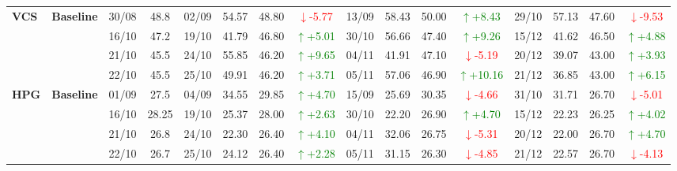 \documentclass{ieeeaccess}
\begin{document}
{\begin{longtable}{llcc|cccc|cccc|cccc}
\multirow{4}{*}{\textbf{VCS}}
& \textbf{Baseline}
& 30/08 & 48.8 & 02/09 & 54.57 & 48.80 & \textcolor{red}{\(\downarrow\)-5.77} & 13/09 & 58.43 & 50.00 & \textcolor{green}{\(\uparrow\)+8.43} & 29/10 & 57.13 & 47.60 & \textcolor{red}{\(\downarrow\)-9.53} \\
& & 16/10 & 47.2 & 19/10 & 41.79 & 46.80 & \textcolor{green}{\(\uparrow\)+5.01} & 30/10 & 56.66 & 47.40 & \textcolor{green}{\(\uparrow\)+9.26} & 15/12 & 41.62 & 46.50 & \textcolor{green}{\(\uparrow\)+4.88} \\
& & 21/10 & 45.5 & 24/10 & 55.85 & 46.20 & \textcolor{green}{\(\uparrow\)+9.65} & 04/11 & 41.91 & 47.10 & \textcolor{red}{\(\downarrow\)-5.19} & 20/12 & 39.07 & 43.00 & \textcolor{green}{\(\uparrow\)+3.93} \\
& & 22/10 & 45.5 & 25/10 & 49.91 & 46.20 & \textcolor{green}{\(\uparrow\)+3.71} & 05/11 & 57.06 & 46.90 & \textcolor{green}{\(\uparrow\)+10.16} & 21/12 & 36.85 & 43.00 & \textcolor{green}{\(\uparrow\)+6.15} \\
\midrule

\multirow{4}{*}{\textbf{HPG}}
& \textbf{Baseline}
& 01/09 & 27.5 & 04/09 & 34.55 & 29.85 & \textcolor{green}{\(\uparrow\)+4.70} & 15/09 & 25.69 & 30.35 & \textcolor{red}{\(\downarrow\)-4.66} & 31/10 & 31.71 & 26.70 & \textcolor{red}{\(\downarrow\)-5.01} \\
& & 16/10 & 28.25 & 19/10 & 25.37 & 28.00 & \textcolor{green}{\(\uparrow\)+2.63} & 30/10 & 22.20 & 26.90 & \textcolor{green}{\(\uparrow\)+4.70} & 15/12 & 22.23 & 26.25 & \textcolor{green}{\(\uparrow\)+4.02} \\
& & 21/10 & 26.8 & 24/10 & 22.30 & 26.40 & \textcolor{green}{\(\uparrow\)+4.10} & 04/11 & 32.06 & 26.75 & \textcolor{red}{\(\downarrow\)-5.31} & 20/12 & 22.00 & 26.70 & \textcolor{green}{\(\uparrow\)+4.70} \\
& & 22/10 & 26.7 & 25/10 & 24.12 & 26.40 & \textcolor{green}{\(\uparrow\)+2.28} & 05/11 & 31.15 & 26.30 & \textcolor{red}{\(\downarrow\)-4.85} & 21/12 & 22.57 & 26.70 & \textcolor{red}{\(\downarrow\)-4.13} \\
\midrule


\end{longtable}}
\end{document}
